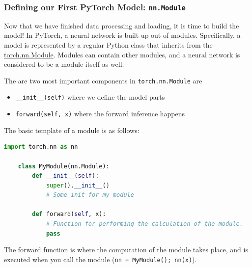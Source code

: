     \subsubsection{Defining our First PyTorch Model: \texttt{nn.Module}}
    \noindent Now that we have finished data processing and loading, it is time to build the model! In PyTorch, a neural network is built up out of modules. 
    Specifically, a model is represented by a regular Python class that inherits from the \href{https://pytorch.org/docs/stable/generated/torch.nn.Module.html}{torch.nn.Module}.
    Modules can contain other modules, and a neural network is considered to be a module itself as well. 

    \noindent The are two most important components in \texttt{torch.nn.Module} are
    \begin{itemize}
        \item \texttt{\_\_init\_\_(self)} where we define the model parts
        \item \texttt{forward(self, x)} where the forward inference happens
    \end{itemize}
    The basic template of a module is as follows:
    \begin{lstlisting}[language=Python]
    import torch.nn as nn

    class MyModule(nn.Module):
        def __init__(self):
            super().__init__()
            # Some init for my module
            
        def forward(self, x):
            # Function for performing the calculation of the module.
            pass
    \end{lstlisting}

    The forward function is where the computation of the module takes place, and is executed when you call the module (\texttt{nn = MyModule(); nn(x)}).

